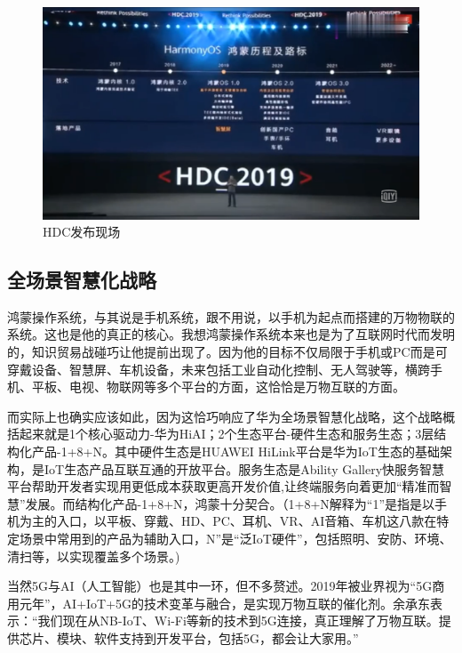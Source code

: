 \documentclass{article}
\begin{document}
\begin{figure}[h]
    \centering
    \includegraphics[scale=0.3]{1.1}
    \caption{HDC发布现场}
    \label{fig:1.1}
    \end{figure} \par
    
\subsection{全场景智慧化战略}
鸿蒙操作系统，与其说是手机系统，跟不用说，以手机为起点而搭建的万物物联的系统。这也是他的真正的核心。我想鸿蒙操作系统本来也是为了互联网时代而发明的，知识贸易战碰巧让他提前出现了。因为他的目标不仅局限于手机或PC而是可穿戴设备、智慧屏、车机设备，未来包括工业自动化控制、无人驾驶等，横跨手机、平板、电视、物联网等多个平台的方面，这恰恰是万物互联的方面。\par 
而实际上也确实应该如此，因为这恰巧响应了华为全场景智慧化战略，这个战略概括起来就是1个核心驱动力-华为HiAI；2个生态平台-硬件生态和服务生态；3层结构化产品-1+8+N。其中硬件生态是HUAWEI HiLink平台是华为IoT生态的基础架构，是IoT生态产品互联互通的开放平台。服务生态是Ability Gallery快服务智慧平台帮助开发者实现用更低成本获取更高开发价值,让终端服务向着更加“精准而智慧”发展。而结构化产品-1+8+N，鸿蒙十分契合。（1+8+N解释为“1”是指是以手机为主的入口，以平板、穿戴、HD、PC、耳机、VR、AI音箱、车机这八款在特定场景中常用到的产品为辅助入口，N”是“泛IoT硬件”，包括照明、安防、环境、清扫等，以实现覆盖多个场景。)\par
当然5G与AI（人工智能）也是其中一环，但不多赘述。2019年被业界视为“5G商用元年”，AI+IoT+5G的技术变革与融合，是实现万物互联的催化剂。余承东表示：“我们现在从NB-IoT、Wi-Fi等新的技术到5G连接，真正理解了万物互联。提供芯片、模块、软件支持到开发平台，包括5G，都会让大家用。” \cite{ref5} \par 
\end{document}
